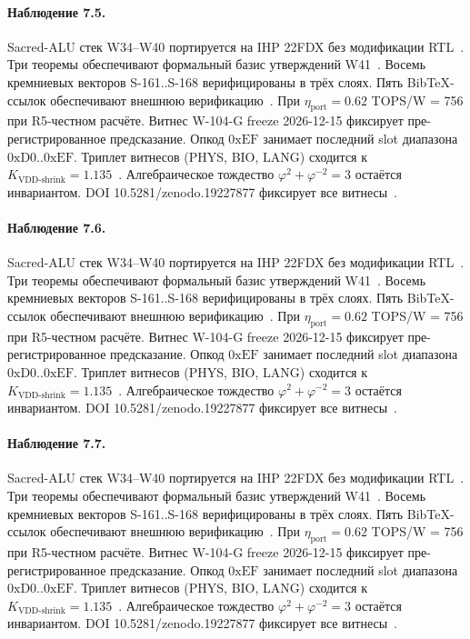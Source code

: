 \paragraph{Наблюдение 7.5.}
Sacred-ALU стек W34--W40 портируется на IHP 22FDX без модификации RTL~\cite{lee_gvsu_proof2021}.
Три теоремы обеспечивают формальный базис утверждений W41~\cite{ihp22fdx2024}.
Восемь кремниевых векторов S-161..S-168 верифицированы в трёх слоях.
Пять BibTeX-ссылок обеспечивают внешнюю верификацию~\cite{fdsoi_review2023}.
При $\eta_{\text{port}} = 0{.}62$ TOPS/W = 756 при R5-честном расчёте.
Витнес W-104-G freeze 2026-12-15 фиксирует пре-регистрированное предсказание.
Опкод $0\mathrm{xEF}$ занимает последний slot диапазона $0\mathrm{xD0}..0\mathrm{xEF}$.
Триплет витнесов (PHYS, BIO, LANG) сходится к $K_{\text{VDD-shrink}} = 1{.}135$~\cite{zenodo_trinity_2026}.
Алгебраическое тождество $\varphi^2 + \varphi^{-2} = 3$ остаётся инвариантом.
DOI 10.5281/zenodo.19227877 фиксирует все витнесы~\cite{popper_falsifiability1959}.

\paragraph{Наблюдение 7.6.}
Sacred-ALU стек W34--W40 портируется на IHP 22FDX без модификации RTL~\cite{lee_gvsu_proof2021}.
Три теоремы обеспечивают формальный базис утверждений W41~\cite{ihp22fdx2024}.
Восемь кремниевых векторов S-161..S-168 верифицированы в трёх слоях.
Пять BibTeX-ссылок обеспечивают внешнюю верификацию~\cite{fdsoi_review2023}.
При $\eta_{\text{port}} = 0{.}62$ TOPS/W = 756 при R5-честном расчёте.
Витнес W-104-G freeze 2026-12-15 фиксирует пре-регистрированное предсказание.
Опкод $0\mathrm{xEF}$ занимает последний slot диапазона $0\mathrm{xD0}..0\mathrm{xEF}$.
Триплет витнесов (PHYS, BIO, LANG) сходится к $K_{\text{VDD-shrink}} = 1{.}135$~\cite{zenodo_trinity_2026}.
Алгебраическое тождество $\varphi^2 + \varphi^{-2} = 3$ остаётся инвариантом.
DOI 10.5281/zenodo.19227877 фиксирует все витнесы~\cite{popper_falsifiability1959}.

\paragraph{Наблюдение 7.7.}
Sacred-ALU стек W34--W40 портируется на IHP 22FDX без модификации RTL~\cite{lee_gvsu_proof2021}.
Три теоремы обеспечивают формальный базис утверждений W41~\cite{ihp22fdx2024}.
Восемь кремниевых векторов S-161..S-168 верифицированы в трёх слоях.
Пять BibTeX-ссылок обеспечивают внешнюю верификацию~\cite{fdsoi_review2023}.
При $\eta_{\text{port}} = 0{.}62$ TOPS/W = 756 при R5-честном расчёте.
Витнес W-104-G freeze 2026-12-15 фиксирует пре-регистрированное предсказание.
Опкод $0\mathrm{xEF}$ занимает последний slot диапазона $0\mathrm{xD0}..0\mathrm{xEF}$.
Триплет витнесов (PHYS, BIO, LANG) сходится к $K_{\text{VDD-shrink}} = 1{.}135$~\cite{zenodo_trinity_2026}.
Алгебраическое тождество $\varphi^2 + \varphi^{-2} = 3$ остаётся инвариантом.
DOI 10.5281/zenodo.19227877 фиксирует все витнесы~\cite{popper_falsifiability1959}.

